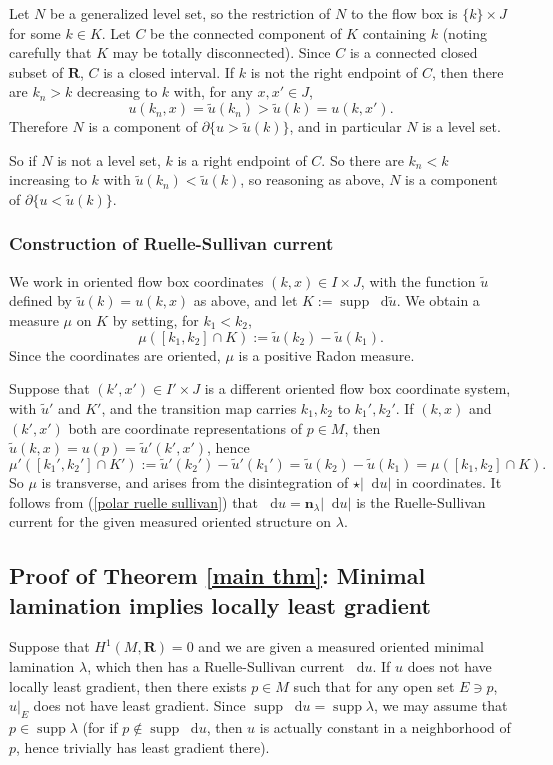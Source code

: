 \documentclass[reqno,11pt]{amsart}
\newcommand{\RR}{\mathbf{R}}
\newcommand*\dif{\mathop{}\!\mathrm{d}}
\DeclareMathOperator{\supp}{supp}
\newcommand{\normal}{\mathbf n}
\theoremstyle{definition}
\numberwithin{equation}{section}
\begin{document}
Let $N$ be a generalized level set, so the restriction of $N$ to the flow box is $\{k\} \times J$ for some $k \in K$.
Let $C$ be the connected component of $K$ containing $k$ (noting carefully that $K$ may be totally disconnected).
Since $C$ is a connected closed subset of $\RR$, $C$ is a closed interval.
If $k$ is not the right endpoint of $C$, then there are $k_n > k$ decreasing to $k$ with, for any $x, x' \in J$,
$$u(k_n, x) = \tilde u(k_n) > \tilde u(k) = u(k, x').$$
Therefore $N$ is a component of $\partial \{u > \tilde u(k)\}$, and in particular $N$ is a level set.

So if $N$ is not a level set, $k$ is a right endpoint of $C$.
So there are $k_n < k$ increasing to $k$ with $\tilde u(k_n) < \tilde u(k)$, so reasoning as above, $N$ is a component of $\partial \{u < \tilde u(k)\}$.

\subsubsection{Construction of Ruelle-Sullivan current}
We work in oriented flow box coordinates $(k, x) \in I \times J$, with the function $\tilde u$ defined by $\tilde u(k) = u(k, x)$ as above, and let $K := \supp \dif \tilde u$.
We obtain a measure $\mu$ on $K$ by setting, for $k_1 < k_2$,
$$\mu([k_1, k_2] \cap K) := \tilde u(k_2) - \tilde u(k_1).$$
Since the coordinates are oriented, $\mu$ is a positive Radon measure.

Suppose that $(k', x') \in I' \times J$ is a different oriented flow box coordinate system, with $\tilde u'$ and $K'$, and the transition map carries $k_1, k_2$ to $k_1', k_2'$.
If $(k, x)$ and $(k', x')$ both are coordinate representations of $p \in M$, then $\tilde u(k, x) = u(p) = \tilde u'(k', x')$, hence
$$\mu'([k_1', k_2'] \cap K') := \tilde u'(k_2') - \tilde u'(k_1') = \tilde u(k_2) - \tilde u(k_1) = \mu([k_1, k_2] \cap K).$$
So $\mu$ is transverse, and arises from the disintegration of $\star |\dif u|$ in coordinates.
It follows from (\ref{polar ruelle sullivan}) that $\dif u = \normal_\lambda |\dif u|$ is the Ruelle-Sullivan current for the given measured oriented structure on $\lambda$.


\subsection{Proof of Theorem \texorpdfstring{\ref{main thm}}{B}: Minimal lamination implies locally least gradient}
Suppose that $H^1(M, \RR) = 0$ and we are given a measured oriented minimal lamination $\lambda$, which then has a Ruelle-Sullivan current $\dif u$.
If $u$ does not have locally least gradient, then there exists $p \in M$ such that for any open set $E \ni p$, $u|_E$ does not have least gradient.
Since $\supp \dif u = \supp \lambda$, we may assume that $p \in \supp \lambda$ (for if $p \notin \supp \dif u$, then $u$ is actually constant in a neighborhood of $p$, hence trivially has least gradient there).
\end{document}
